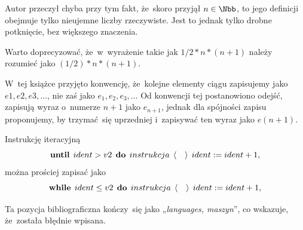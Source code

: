 \documentclass[a4paper,11pt]{article}
\numberwithin{equation}{section}
\newcommand{\twoAngels}{\langle \hspace{1em} \rangle}
\newcommand{\doKeyword}{\text{\textbf{do}}}
\newcommand{\untilKeyword}{\text{\textbf{until}}}
\newcommand{\whileKeyword}{\text{\textbf{while}}}
\begin{document}
Autor przeczył chyba przy tym fakt, że~skoro przyjął $n \in \Nbb$, to jego
definicji obejmuje tylko nieujemne liczby rzeczywiste. Jest to jednak tylko
drobne potknięcie, bez większego znaczenia.





\noindent
{} Warto doprecyzować, że~w~wyrażenie takie jak
$1/2 * n * ( n + 1 )$ należy rozumieć jako $( 1 / 2 ) * n * ( n + 1 )$.

\VerSpaceFour





\noindent
{} W~tej książce przyjęto konwencję, że~kolejne elementy
ciągu zapisujemy jako $e1, e2, e3, \ldots$, nie zaś jako
$e_{ 1 }, e_{ 2 }, e_{ 3 }, \ldots${ } Od konwencji tej postanowiono odejść,
zapisują wyraz o~numerze $n + 1$ jako $e_{ n + 1 }$, jednak dla spójności
zapisu proponujemy, by trzymać~się uprzedniej i~zapisywać ten wyraz jako
$e( n + 1 )$.

\VerSpaceFour





\noindent
{} Instrukcję iteracyjną
\begin{equation}
  \label{eq:Brady-Infromatyka-ETC-01}
  \untilKeyword \;\, ident > v2 \;\, \doKeyword \;\, instrukcja \;\,
  \twoAngels \;\, ident := ident + 1,
\end{equation}
można prościej zapisać jako
\begin{equation}
  \label{eq:Brady-Infromatyka-ETC-01}
  \whileKeyword \;\, ident \leq v2 \;\, \doKeyword \;\, instrukcja \;\,
  \twoAngels \;\, ident := ident + 1,
\end{equation}

\VerSpaceFour





\noindent
{} Ta pozycja bibliograficzna kończy~się jako
„\textit{languages, maszyn}”, co wskazuje, że~została błędnie wpisana.

\VerSpaceFour






\newpage

\end{document}
